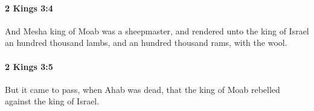 		\paragraph{2 Kings 3:4} %
			\label{2KINGS-3-4}

			And Mesha king of Moab was a sheepmaster, and rendered unto the king of Israel an hundred thousand lambs, and an hundred thousand rams, with the wool.


		\paragraph{2 Kings 3:5} %
			\label{2KINGS-3-5}

			But it came to pass, when Ahab was dead, that the king of Moab rebelled against the king of Israel.


